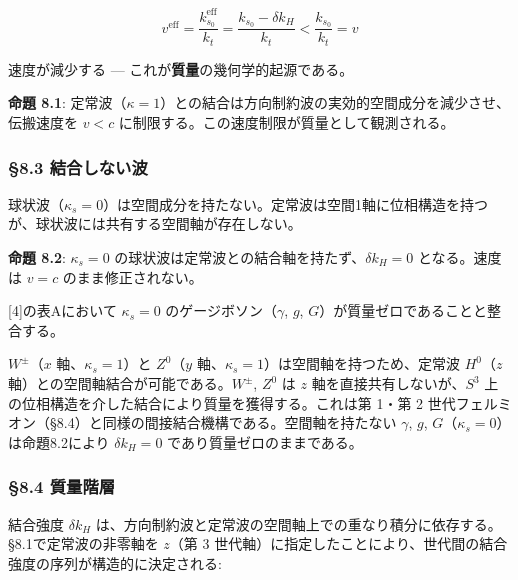 \documentclass[
  a4paper,11pt]{ltjsarticle}
\theoremstyle{definition}
\theoremstyle{remark}
\begin{document}
\[v^{\text{eff}} = \frac{k_{s_0}^{\text{eff}}}{k_t} = \frac{k_{s_0} - \delta k_H}{k_t} < \frac{k_{s_0}}{k_t} = v\]

速度が減少する --- これが\textbf{質量}の幾何学的起源である。

\textbf{命題 8.1}:
定常波（\(\kappa = 1\)）との結合は方向制約波の実効的空間成分を減少させ、伝搬速度を
\(v < c\) に制限する。この速度制限が質量として観測される。

\subsubsection{§8.3
結合しない波}\label{ux7d50ux5408ux3057ux306aux3044ux6ce2}

球状波（\(\kappa_s = 0\)）は空間成分を持たない。定常波は空間1軸に位相構造を持つが、球状波には共有する空間軸が存在しない。

\textbf{命題 8.2}: \(\kappa_s = 0\)
の球状波は定常波との結合軸を持たず、\(\delta k_H = 0\) となる。速度は
\(v = c\) のまま修正されない。

{[}4{]}の表Aにおいて \(\kappa_s = 0\) のゲージボソン（\(\gamma\), \(g\),
\(G\)）が質量ゼロであることと整合する。

\(W^{\pm}\)（\(x\) 軸、\(\kappa_s = 1\)）と \(Z^0\)（\(y\)
軸、\(\kappa_s = 1\)）は空間軸を持つため、定常波 \(H^0\)（\(z\)
軸）との空間軸結合が可能である。\(W^{\pm}\), \(Z^0\) は \(z\)
軸を直接共有しないが、\(S^3\)
上の位相構造を介した結合により質量を獲得する。これは第 1・第 2
世代フェルミオン（§8.4）と同様の間接結合機構である。空間軸を持たない
\(\gamma\), \(g\), \(G\)（\(\kappa_s = 0\)）は命題8.2により
\(\delta k_H = 0\) であり質量ゼロのままである。

\subsubsection{§8.4 質量階層}\label{ux8ceaux91cfux968eux5c64}

結合強度 \(\delta k_H\)
は、方向制約波と定常波の空間軸上での重なり積分に依存する。§8.1で定常波の非零軸を
\(z\)（第 3
世代軸）に指定したことにより、世代間の結合強度の序列が構造的に決定される:
\end{document}
